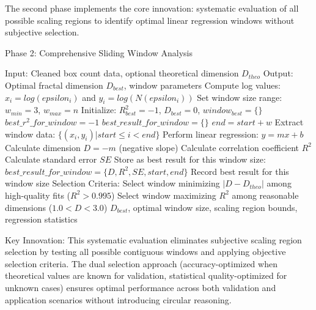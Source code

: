 \documentclass[preprint,12pt]{elsarticle}
\def\textbf#1{#1}%
\def\log{log}%
\def\epsilon{epsilon}%
\begin{document}
The second phase implements the core innovation: systematic evaluation of all possible scaling regions to identify optimal linear regression windows without subjective selection.

\begin{algorithm}[H]
\caption{Phase 2: Comprehensive Sliding Window Analysis}
\begin{algorithmic}[1]
\small
\State \textbf{Input:} Cleaned box count data, optional theoretical dimension $D_{theo}$
\State \textbf{Output:} Optimal fractal dimension $D_{best}$, window parameters
\State
\State Compute log values: $x_i = \log(\epsilon_i)$ and $y_i = \log(N(\epsilon_i))$
\State Set window size range: $w_{min} = 3$, $w_{max} = n$
\State Initialize: $R^2_{best} = -1$, $D_{best} = 0$, $window_{best} = \{\}$
\State
{}
    \State $best\_r^2\_for\_window = -1$
    \State $best\_result\_for\_window = \{\}$
    \State
        \State $end = start + w$
        \State Extract window data: $\{(x_i, y_i) | start \leq i < end\}$
        \State
        \State Perform linear regression: $y = mx + b$
        \State Calculate dimension $D = -m$ (negative slope)
        \State Calculate correlation coefficient $R^2$
        \State Calculate standard error $SE$
        \State
            \State Store as best result for this window size:
            \State $best\_result\_for\_window = \{D, R^2, SE, start, end\}$
        \EndIf
    \EndFor
    \State
    \State Record best result for this window size
\EndFor
\State
\State \textbf{Selection Criteria:}
    \State Select window minimizing $|D - D_{theo}|$ among high-quality fits ($R^2 > 0.995$)
\Else
    \State Select window maximizing $R^2$ among reasonable dimensions ($1.0 < D < 3.0$)
\EndIf
\State
\State \Return $D_{best}$, optimal window size, scaling region bounds, regression statistics
\end{algorithmic}
\end{algorithm}

\textbf{Key Innovation}: This systematic evaluation eliminates subjective scaling region selection by testing all possible contiguous windows and applying objective selection criteria. The dual selection approach (accuracy-optimized when theoretical values are known for validation, statistical quality-optimized for unknown cases) ensures optimal performance across both validation and application scenarios without introducing circular reasoning.
\end{document}
